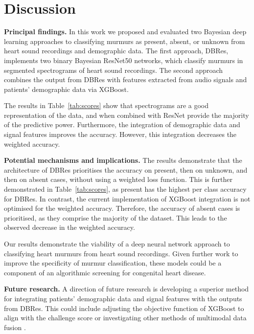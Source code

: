 \documentclass[twocolumn]{cinc}
\begin{document}
\section{Discussion}
{\bf Principal findings.} 
In this work we proposed and evaluated two Bayesian deep learning approaches to classifying murmurs as present, absent, or unknown from heart sound recordings and demographic data. The first approach, DBRes, implements two binary Bayesian ResNet50 networks, which classify murmurs in segmented spectrograms of heart sound recordings. 
The second approach combines the output from DBRes with features extracted from audio signals and patients' demographic data via XGBoost. 



The results in Table~\ref{tab:scores} show that spectrograms are a good representation of the data, and  when combined with ResNet provide the majority of the predictive power. Furthermore, the integration of demographic data and signal features improves the accuracy. However, this integration decreases the weighted accuracy.

{\bf Potential mechanisms and implications.} 
The results demonstrate that the architecture of DBRes prioritises the accuracy on present, then on unknown, and then on absent cases, without using a weighted loss function. This is further demonstrated in Table~\ref{tab:scores}, as present has the highest per class accuracy for DBRes. In contrast, the current implementation of XGBoost integration is not optimised for the weighted accuracy. Therefore, the accuracy of absent cases is prioritised, as they comprise the majority of the dataset. This leads to the observed decrease in the weighted accuracy.



Our results demonstrate the viability of a deep neural network approach to classifying heart murmurs from heart sound recordings. Given further work to improve the specificity of murmur classification, these models could be a component of an algorithmic screening for congenital heart disease.

{\bf Future research.} 
A direction of future research is developing a superior method for integrating patients' demographic data and signal features with the outputs from DBRes. This could include adjusting the objective function of XGBoost to align with the challenge score or investigating other methods of multimodal data fusion  \cite{duvieusart2022multimodal}. 
\end{document}

